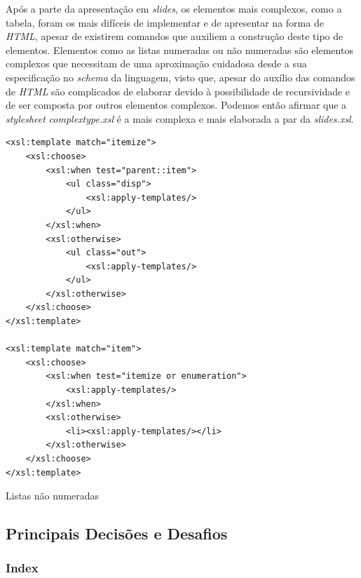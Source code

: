 \documentclass[a4paper]{article}
\begin{document}
\hspace{1cm}Após a parte da apresentação em \emph{slides}, os elementos mais complexos, como a tabela, foram os mais difíceis de implementar e de apresentar na forma de \emph{HTML}, apesar de existirem comandos que auxiliem a construção deste tipo de elementos. Elementos como as listas numeradas ou não numeradas são elementos complexos que necessitam de uma aproximação cuidadosa desde a sua especificação no \emph{schema} da linguagem, visto que, apesar do auxílio das comandos de \emph{HTML}
são complicados de elaborar devido à possibilidade de recursividade e de ser composta por outros elementos complexos. Podemos então afirmar que a \emph{stylesheet} \emph{complextype.xsl} é a mais complexa e mais elaborada a par da \emph{slides.xsl}.\\
         
\begin{small}                        
\begin{lstlisting}
<xsl:template match="itemize">
    <xsl:choose>
        <xsl:when test="parent::item">
            <ul class="disp">
                <xsl:apply-templates/>
            </ul>
        </xsl:when>
        <xsl:otherwise>
            <ul class="out">
                <xsl:apply-templates/>
            </ul>
        </xsl:otherwise>
    </xsl:choose>
</xsl:template>

<xsl:template match="item">
    <xsl:choose>
        <xsl:when test="itemize or enumeration">
            <xsl:apply-templates/>
        </xsl:when>
        <xsl:otherwise>
            <li><xsl:apply-templates/></li>
        </xsl:otherwise>
    </xsl:choose>
</xsl:template>
\end{lstlisting}
\end{small}
\begin{footnotesize}
\begin{center}
\caption{Listas não numeradas}
\end{center}
\end{footnotesize}

\subsection{\large Principais Decisões e Desafios}

\subsubsection{Index}                           
\end{document}
